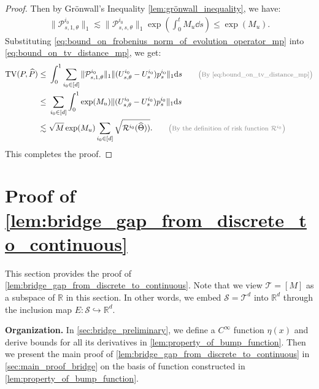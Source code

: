 \documentclass[12pt]{article}
\numberwithin{equation}{section}
\let\hat\widehat
\newcommand{\wh}{\widehat}
\renewcommand{\hat}{\wh}
\def\R{\mathbb{R}}
\theoremstyle{theoremstyle}
\numberwithin{equation}{section}
\numberwithin{theorem}{section}
\numberwithin{proposition}{section}
\numberwithin{definition}{section}
\numberwithin{lemma}{section}
\numberwithin{assumption}{section}
\numberwithin{remark}{section}
\newcommand*{\annot}[1]{\tag*{\footnotesize{\textcolor{black!50}{\big(#1\big)}}}}
\begin{document}
\begin{proof}
Then by Grönwall’s Inequality \cref{lem:grönwall_inequality}, we have:
\begin{align}
\label{eq:bound_on_frobenius_norm_of_evolution_operator_mp}
    \|\mathcal{P}_{s,1,\theta}^{i_0}\|_1 
    \lesssim \|\mathcal{P}_{s,s,\theta}^{i_0}\|_1 \exp(\int_0^t  M_u \dd s)
    \leq \exp(M_u).
\end{align}
Substituting \eqref{eq:bound_on_frobenius_norm_of_evolution_operator_mp} into 
\eqref{eq:bound_on_tv_distance_mp}, we get:
\begin{align*}
    \text{TV}(P,\hat{P})
    \leq & ~ 
    \int_0^1 \sum_{i_0 \in [d]} \|\mathcal{P}_{s,1,\theta}^{i_0}\|_1 
    \|(U_{s,\theta}^{i_0}-U_s^{i_0}) p_s^{i_0}\|_1 \dd s 
    \annot{By \eqref{eq:bound_on_tv_distance_mp}} \\
    \leq & ~ \sum_{i_0 \in [d]}
    \int_0^1 \exp(M_u) 
    \|(U_{s,\theta}^{i_0}-U_s^{i_0}) p_s^{i_0}\|_1 \dd s \\
    \lesssim & ~ 
    \sqrt{M} \exp(M_u) 
    \sum_{i_0 \in [d]} \sqrt{\mathcal{R}^{i_0}(\hat{\Theta}))}. 
    \annot{By the definition of risk function $\mathcal{R}^{i_0}$}
\end{align*}
This completes the proof.
\end{proof}

\clearpage
\section{\texorpdfstring{Proof of \cref{lem:bridge_gap_from_discrete_to_continuous}}{Proof of Lemma \ref{lem:bridge_gap_from_discrete_to_continuous}}}
\label{sec:proof_extenstion_velocity}

This section provides the proof of \cref{lem:bridge_gap_from_discrete_to_continuous}.
Note that we view $\mathcal{T}=[M]$ as a subspace of $\R$ in this section.
In other words, we embed $\mathcal{S}=\mathcal{T}^d$ into $\R^d$ through the inclusion map $E :\mathcal{S}\hookrightarrow\R^d$.

\textbf{Organization.}
In \cref{sec:bridge_preliminary}, we define a $C^\infty$ function $\eta(x)$ and derive bounds for all its derivatives in \cref{lem:property_of_bump_function}.
Then we present the main proof of \cref{lem:bridge_gap_from_discrete_to_continuous} in \cref{sec:main_proof_bridge} on the basis of function constructed in \cref{lem:property_of_bump_function}.
\end{document}
